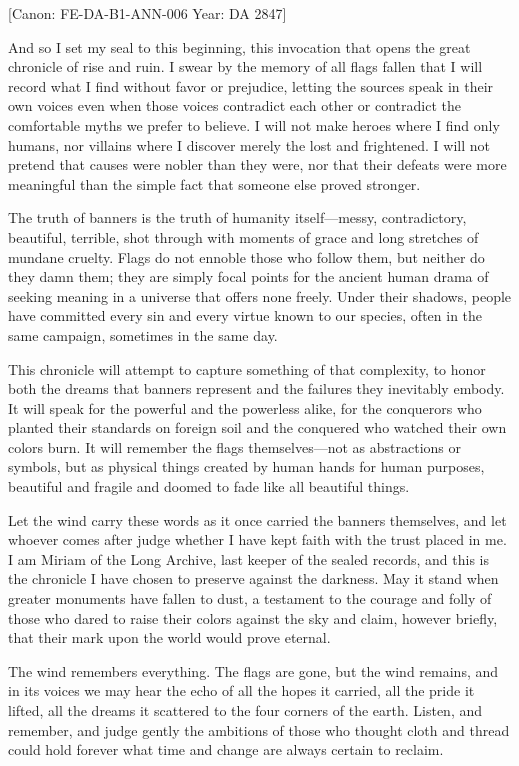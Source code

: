 {[}Canon: FE-DA-B1-ANN-006 \textbar{} Year: DA 2847{]}

And so I set my seal to this beginning, this invocation that opens the
great chronicle of rise and ruin. I swear by the memory of all flags
fallen that I will record what I find without favor or prejudice,
letting the sources speak in their own voices even when those voices
contradict each other or contradict the comfortable myths we prefer to
believe. I will not make heroes where I find only humans, nor villains
where I discover merely the lost and frightened. I will not pretend that
causes were nobler than they were, nor that their defeats were more
meaningful than the simple fact that someone else proved stronger.

The truth of banners is the truth of humanity itself---messy,
contradictory, beautiful, terrible, shot through with moments of grace
and long stretches of mundane cruelty. Flags do not ennoble those who
follow them, but neither do they damn them; they are simply focal points
for the ancient human drama of seeking meaning in a universe that offers
none freely. Under their shadows, people have committed every sin and
every virtue known to our species, often in the same campaign, sometimes
in the same day.

This chronicle will attempt to capture something of that complexity, to
honor both the dreams that banners represent and the failures they
inevitably embody. It will speak for the powerful and the powerless
alike, for the conquerors who planted their standards on foreign soil
and the conquered who watched their own colors burn. It will remember
the flags themselves---not as abstractions or symbols, but as physical
things created by human hands for human purposes, beautiful and fragile
and doomed to fade like all beautiful things.

Let the wind carry these words as it once carried the banners
themselves, and let whoever comes after judge whether I have kept faith
with the trust placed in me. I am Miriam of the Long Archive, last
keeper of the sealed records, and this is the chronicle I have chosen to
preserve against the darkness. May it stand when greater monuments have
fallen to dust, a testament to the courage and folly of those who dared
to raise their colors against the sky and claim, however briefly, that
their mark upon the world would prove eternal.

The wind remembers everything. The flags are gone, but the wind remains,
and in its voices we may hear the echo of all the hopes it carried, all
the pride it lifted, all the dreams it scattered to the four corners of
the earth. Listen, and remember, and judge gently the ambitions of those
who thought cloth and thread could hold forever what time and change are
always certain to reclaim.

